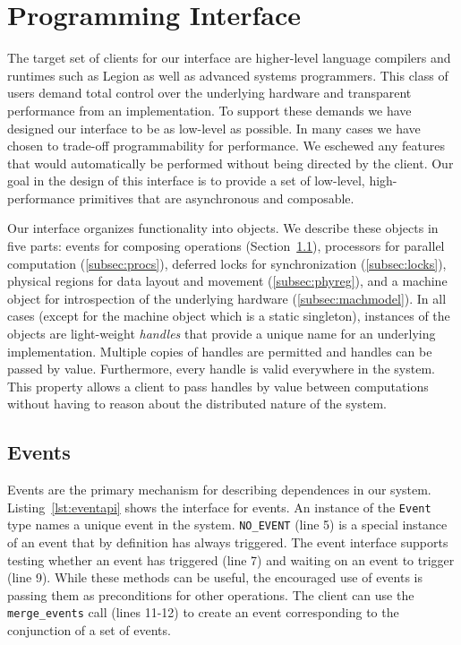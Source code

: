 
\section{Programming Interface}
\label{sec:interface}
The target set of clients for our interface are higher-level language
compilers and runtimes such as Legion\cite{Legion12} as well as 
advanced systems programmers.  This class of users demand total control
over the underlying hardware and transparent performance from an
implementation.  To support these demands we have designed our interface
to be as low-level as possible.  In many cases we have chosen to trade-off
programmability for performance.  We eschewed any features that would
automatically be performed without being directed by the client.
Our goal in the design of this interface is to provide a set of low-level,
high-performance primitives that are asynchronous and composable.

Our interface organizes functionality into objects.  We describe
these objects in five parts: events for composing operations 
(Section~\ref{subsec:events}), processors for parallel computation 
(\ref{subsec:procs}), deferred locks for synchronization
(\ref{subsec:locks}), physical regions for data layout and movement
(\ref{subsec:phyreg}), and a machine object for introspection of the underlying
hardware (\ref{subsec:machmodel}).  In all cases (except for the
machine object which is a static singleton), instances of the objects
are light-weight {\em handles} that provide a unique name for an underlying
implementation.  Multiple copies of handles are permitted and handles can be 
passed by value.  Furthermore, every handle is valid everywhere in the system.  
This property allows a client to pass handles by value between computations 
without having to reason about the distributed nature of the system.

\lstset{
  captionpos=b,
  language=C++,
  basicstyle=\scriptsize,
  numbers=left,
  numberstyle=\tiny,
  columns=fullflexible,
  stepnumber=1,
  escapechar=\#,
  keepspaces=true,
}

\subsection{Events}
\label{subsec:events}
Events are the primary mechanism for describing dependences in our system.
Listing~\ref{lst:eventapi} shows the interface for events.  An instance of the {\tt Event} type 
names a unique event in the system.  {\tt NO\_EVENT} (line 5) is a special instance
of an event that by definition has always triggered.  The event interface
supports testing whether an event has triggered (line 7) and waiting on
an event to trigger (line 9).  While these methods can be useful, the encouraged
use of events is passing them as preconditions for other operations.  The client can use the
{\tt merge\_events} call (lines 11-12) to create an event corresponding to the 
conjunction of a set of events.

